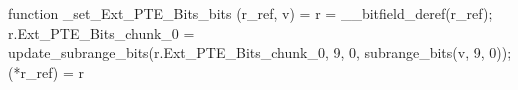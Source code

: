function _set_Ext_PTE_Bits_bits (r_ref, v) = {
    r = __bitfield_deref(r_ref);
    r.Ext_PTE_Bits_chunk_0 = update_subrange_bits(r.Ext_PTE_Bits_chunk_0, 9, 0, subrange_bits(v, 9, 0));
    (*r_ref) = r
}
